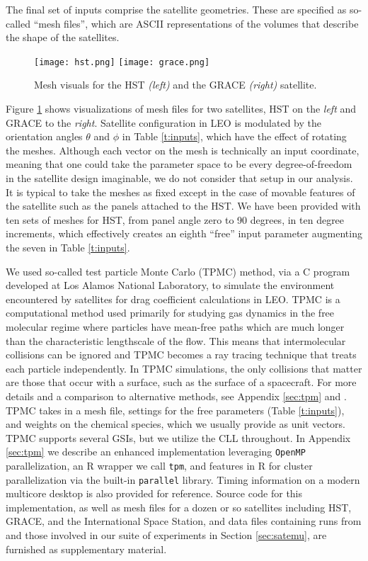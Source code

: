 \documentclass[12pt]{article}
\begin{document}
The final set of inputs comprise the satellite geometries.  These are
specified as so-called ``mesh files'', which are ASCII representations of 
the volumes that describe the shape of the satellites.
\begin{figure}[ht!]
\centering
\texttt{[image: hst.png]} \hspace{0.5cm}
\texttt{[image: grace.png]}
\caption{Mesh visuals for the HST {\em (left)} and 
the GRACE {\em (right)} satellite.}
\label{f:mesh}
\end{figure}
Figure \ref{f:mesh} shows visualizations of mesh files for two satellites, HST
on the {\em left} and GRACE to the {\em right}.  Satellite configuration in LEO is
modulated by the orientation angles $\theta$ and $\phi$ in Table
\ref{t:inputs}, which have the effect of rotating the meshes.  Although each
vector on the mesh is technically an input coordinate, meaning that one could
take the parameter space to be every degree-of-freedom in the satellite design
imaginable, we do not consider that setup in our analysis.  It is typical to
take the meshes as fixed except in the case of movable features of the
satellite such as the panels attached to the HST.  We have been provided with
ten sets of meshes for HST, from panel angle zero to 90 degrees, in ten
degree increments, which effectively creates an eighth ``free'' input
parameter augmenting the seven in Table \ref{t:inputs}.

We used so-called test particle Monte Carlo (TPMC) method, via a {\sf C}
program developed at Los Alamos National Laboratory, to simulate the
environment encountered by satellites for drag coefficient calculations in
LEO.  TPMC is a computational method used primarily for studying gas dynamics 
in the free molecular regime where particles have mean-free paths which are 
much longer than the characteristic lengthscale of the flow. This means 
that intermolecular collisions can be ignored and TPMC becomes a ray tracing 
technique that treats each particle independently.  In TPMC simulations, the only 
collisions that matter are those that occur with a surface, such as the surface 
of a spacecraft.  For more details and a comparison to alternative methods, see 
Appendix \ref{sec:tpm} and \cite{mehta:etal:2014b}.  TPMC takes in a mesh file, 
settings for the free parameters (Table \ref{t:inputs}), and weights on the chemical 
species, which we usually provide as unit vectors.  TPMC supports several GSIs, 
but we utilize the CLL throughout.  In Appendix \ref{sec:tpm} we describe an 
enhanced implementation leveraging {\tt OpenMP} parallelization, an {\sf R} \citep{cranR} 
wrapper we call {\tt tpm}, and features in {\sf R} for cluster parallelization via the 
built-in {\tt parallel} library.  Timing information on a modern multicore desktop is 
also provided for reference. Source code for this implementation, as well as mesh 
files for a dozen or so satellites including HST, GRACE, and the International 
Space Station, and data files containing runs from \cite{metha:etal:2014} and those 
involved in our suite of experiments in Section \ref{sec:satemu}, are furnished as 
supplementary material.
\end{document}
